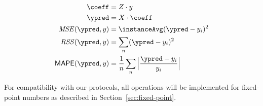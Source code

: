 \begin{align*}
\coeff &= Z \cdot y
\\
\ypred &= X \cdot \coeff
\\
\mathit{MSE}(\ypred, y) &= \instanceAvg (\ypred - y_i)^2
\\
\mathit{RSS}(\ypred, y) &= \sum_n (\ypred - y_i)^2
\\
\mathsf{MAPE}(\ypred, y) &= \frac{1}{n} \sum_n \Big| \frac{\ypred - y_i}{y_i} \Big|
\end{align*}










For compatibility with our protocols, all operations will be implemented for fixed-point numbers as described in Section~\ref{sec:fixed-point}.
